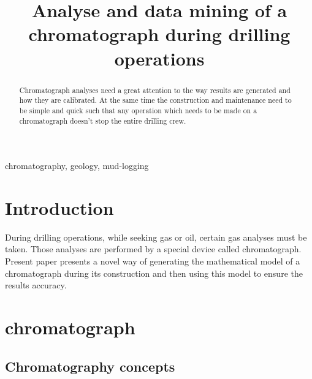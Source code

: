 \documentclass[conference]{IEEEtran}
\begin{document}
\title{Analyse and data mining of a chromatograph during drilling operations}

\author{
    \and
}

\maketitle

\begin{abstract}
    Chromatograph analyses need a great attention to the way results are generated and how they are calibrated.
    At the same time the construction and maintenance need to be simple and quick such that any operation which
    needs to be made on a chromatograph doesn't stop the entire drilling crew.
\end{abstract}

\begin{IEEEkeywords}
chromatography, geology, mud-logging
\end{IEEEkeywords}

\section{Introduction}
    During drilling operations, while seeking gas or oil, certain gas analyses must be taken.
    Those analyses are performed by a special device called chromatograph. 
    Present paper presents a novel way of generating the mathematical model of a chromatograph during its construction
    and then using this model to ensure the results accuracy.
\section{chromatograph}

\subsection{Chromatography concepts}
\end{document}
